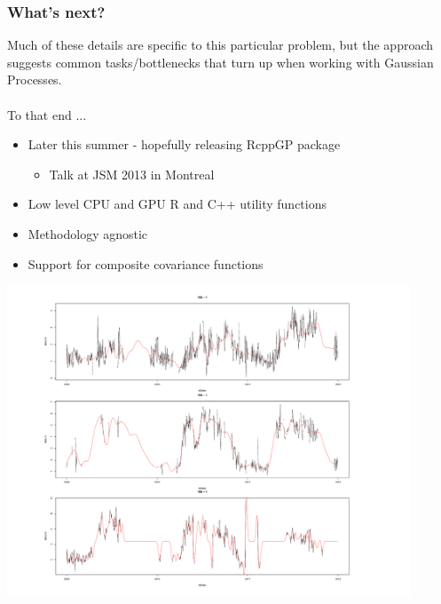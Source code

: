 \documentclass{beamer}
\begin{document}

\begin{frame}
\frametitle{What's next?}

Much of these details are specific to this particular problem, but the approach suggests common tasks/bottlenecks that turn up when working with Gaussian Processes.\\
~\\ \pause
To that end ...

\begin{itemize}
\item Later this summer - hopefully releasing RcppGP package
\begin{itemize}
\item Talk at JSM 2013 in Montreal
\end{itemize}
\item Low level CPU and GPU R and C++ utility functions 
\item Methodology agnostic
\item Support for composite covariance functions
\end{itemize}

\pause

\begin{center}
\includegraphics[width=0.9\textwidth]{pics/sensor.pdf}
\end{center}

\end{frame}

\end{document}

